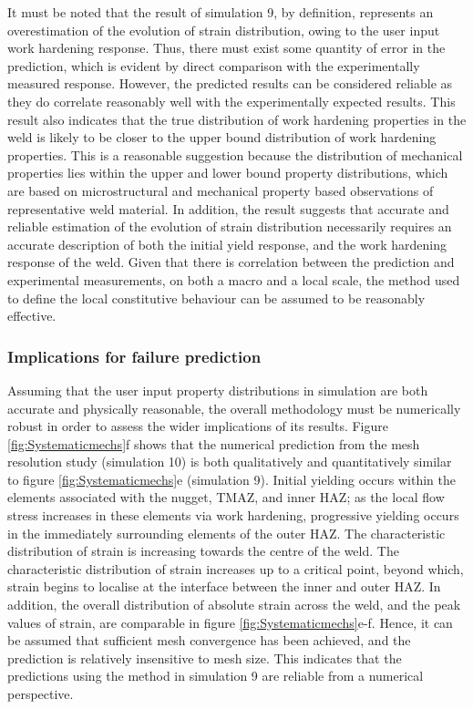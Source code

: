 It must be noted that the result of simulation 9, by definition, represents an overestimation of the evolution of strain distribution, owing to the user input work hardening response. Thus, there must exist some quantity of error in the prediction, which is evident by direct comparison with the experimentally measured response. However, the predicted results can be considered reliable as they do correlate reasonably well with the experimentally expected results. This result also indicates that the true distribution of work hardening properties in the weld is likely to be closer to the upper bound distribution of work hardening properties. This is a reasonable suggestion because the distribution of mechanical properties lies within the upper and lower bound property distributions, which are based on microstructural and mechanical property based observations of representative weld material. In addition, the result suggests that accurate and reliable estimation of the evolution of strain distribution necessarily requires an accurate description of both the initial yield response, and the work hardening response of the weld. Given that there is correlation between the prediction and experimental measurements, on both a macro and a local scale, the method used to define the local constitutive behaviour can be assumed to be reasonably effective. 

\subsubsection{Implications for failure prediction}
\label{SMDModellingstudyDiscussionPropertydistributionsImplications}
Assuming that the user input property distributions in simulation are both accurate and physically reasonable, the overall methodology must be numerically robust in order to assess the wider implications of its results. Figure \ref{fig:Systematicmechs}f shows that the numerical prediction from the mesh resolution study (simulation 10) is both qualitatively and quantitatively similar to figure \ref{fig:Systematicmechs}e (simulation 9). Initial yielding occurs within the elements associated with the nugget, TMAZ, and inner HAZ; as the local flow stress increases in these elements via work hardening, progressive yielding occurs in the immediately surrounding elements of the outer HAZ. The characteristic distribution of strain is increasing towards the centre of the weld. The characteristic distribution of strain increases up to a critical point, beyond which, strain begins to localise at the interface between the inner and outer HAZ. In addition, the overall distribution of absolute strain across the weld, and the peak values of strain, are comparable in figure \ref{fig:Systematicmechs}e-f. Hence, it can be assumed that sufficient mesh convergence has been achieved, and the prediction is relatively insensitive to mesh size. This indicates that the predictions using the method in simulation 9 are reliable from a numerical perspective.

